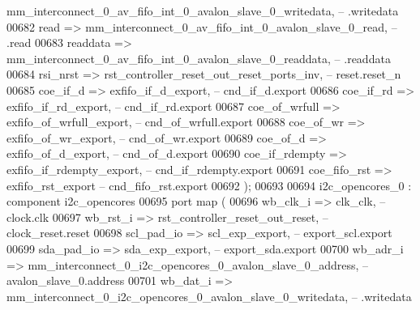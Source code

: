 \begin{DoxyCode}
      mm_interconnect_0_av_fifo_int_0_avalon_slave_0_writedata,\textcolor{keyword}{  --               .writedata}
00682             read           => 
      mm_interconnect_0_av_fifo_int_0_avalon_slave_0_read,\textcolor{keyword}{       --               .read}
00683             readdata       => 
      mm_interconnect_0_av_fifo_int_0_avalon_slave_0_readdata,\textcolor{keyword}{   --               .readdata}
00684             rsi_nrst       => rst_controller_reset_out_reset_ports_inv,\textcolor{keyword}{                  --         
       reset.reset\_n}
00685             coe_if_d       => exfifo_if_d_export,\textcolor{keyword}{                                        --      
       cnd\_if\_d.export}
00686             coe_if_rd      => exfifo_if_rd_export,\textcolor{keyword}{                                       --     
       cnd\_if\_rd.export}
00687             coe_of_wrfull  => exfifo_of_wrfull_export,\textcolor{keyword}{                                   -- 
       cnd\_of\_wrfull.export}
00688             coe_of_wr      => exfifo_of_wr_export,\textcolor{keyword}{                                       --     
       cnd\_of\_wr.export}
00689             coe_of_d       => exfifo_of_d_export,\textcolor{keyword}{                                        --      
       cnd\_of\_d.export}
00690             coe_if_rdempty => exfifo_if_rdempty_export,\textcolor{keyword}{                                  --
       cnd\_if\_rdempty.export}
00691             coe_fifo_rst   => exfifo_rst_export                                          \textcolor{keyword}{--  
       cnd\_fifo\_rst.export}
00692         \textcolor{vhdlchar}{)};
00693 
00694     i2c_opencores_0 : \textcolor{keywordflow}{component} i2c\_opencores
00695         \textcolor{keywordflow}{port} \textcolor{keywordflow}{map} (
00696             wb\_clk\_i   => clk_clk,\textcolor{keyword}{                                                     --           
       clock.clk}
00697             wb\_rst\_i   => rst_controller_reset_out_reset,\textcolor{keyword}{                              --     
       clock\_reset.reset}
00698             scl\_pad\_io => scl_exp_export,\textcolor{keyword}{                                              --      
       export\_scl.export}
00699             sda\_pad\_io => sda_exp_export,\textcolor{keyword}{                                              --      
       export\_sda.export}
00700             wb\_adr\_i   => 
      mm_interconnect_0_i2c_opencores_0_avalon_slave_0_address,\textcolor{keyword}{    --   avalon\_slave\_0.address}
00701             wb\_dat\_i   => 
      mm_interconnect_0_i2c_opencores_0_avalon_slave_0_writedata,\textcolor{keyword}{  --                 .writedata}

\end{DoxyCode}

